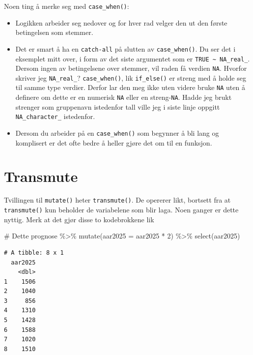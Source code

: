 \documentclass[
  letterpaper,
  DIV=11,
  numbers=noendperiod]{scrreprt}
\newenvironment{Shaded}{\begin{snugshade}}{\end{snugshade}}
\newcommand{\AttributeTok}[1]{\textcolor[rgb]{0.40,0.45,0.13}{#1}}
\newcommand{\CommentTok}[1]{\textcolor[rgb]{0.37,0.37,0.37}{#1}}
\newcommand{\DecValTok}[1]{\textcolor[rgb]{0.68,0.00,0.00}{#1}}
\newcommand{\FunctionTok}[1]{\textcolor[rgb]{0.28,0.35,0.67}{#1}}
\newcommand{\NormalTok}[1]{\textcolor[rgb]{0.00,0.23,0.31}{#1}}
\newcommand{\SpecialCharTok}[1]{\textcolor[rgb]{0.37,0.37,0.37}{#1}}
\providecommand{\tightlist}{%
  \setlength{\itemsep}{0pt}\setlength{\parskip}{0pt}}\usepackage{longtable,booktabs,array}
\begin{document}
Noen ting å merke seg med \texttt{case\_when()}:

\begin{itemize}
\tightlist
\item
  Logikken arbeider seg nedover og for hver rad velger den ut den første
  betingelsen som stemmer.
\item
  Det er smart å ha en \texttt{catch-all} på slutten av
  \texttt{case\_when()}. Du ser det i eksemplet mitt over, i form av det
  siste argumentet som er \texttt{TRUE\ \textasciitilde{}\ NA\_real\_}.
  Dersom ingen av betingelsene over stemmer, vil raden få verdien
  \texttt{NA}. Hvorfor skriver jeg \texttt{NA\_real\_}?
  \texttt{case\_when()}, lik \texttt{if\_else()} er streng med å holde
  seg til samme type verdier. Derfor lar den meg ikke uten videre bruke
  \texttt{NA} uten å definere om dette er en numerisk \texttt{NA} eller
  en streng-\texttt{NA}. Hadde jeg brukt strenger som gruppenavn
  istedenfor tall ville jeg i siste linje oppgitt
  \texttt{NA\_character\_} istedenfor.
\item
  Dersom du arbeider på en \texttt{case\_when()} som begynner å bli lang
  og komplisert er det ofte bedre å heller gjøre det om til en funksjon.
\end{itemize}

\hypertarget{transmute}{%
\section{Transmute}\label{transmute}}

Tvillingen til \texttt{mutate()} heter \texttt{transmute()}. De opererer
likt, bortsett fra at \texttt{transmute()} kun beholder de variabelene
som blir laga. Noen ganger er dette nyttig. Merk at det gjør disse to
kodebrokkene lik

\begin{Shaded}
\begin{Highlighting}[]
\CommentTok{\# Dette}
\NormalTok{prognose }\SpecialCharTok{\%\textgreater{}\%} 
  \FunctionTok{mutate}\NormalTok{(}\AttributeTok{aar2025 =}\NormalTok{ aar2025 }\SpecialCharTok{*} \DecValTok{2}\NormalTok{) }\SpecialCharTok{\%\textgreater{}\%} 
  \FunctionTok{select}\NormalTok{(aar2025)}
\end{Highlighting}
\end{Shaded}

\begin{verbatim}
# A tibble: 8 x 1
  aar2025
    <dbl>
1    1506
2    1040
3     856
4    1310
5    1428
6    1588
7    1020
8    1510
\end{verbatim}
\end{document}
